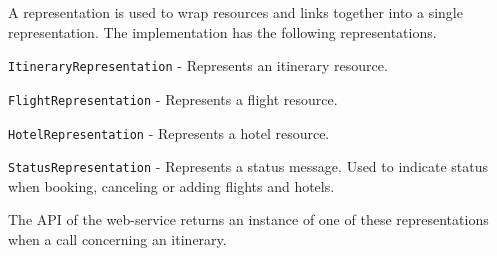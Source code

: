 \noindent
A representation is used to wrap resources and links together into a single representation. 
The implementation has the following representations.
\begin{description}
	\item \texttt{ItineraryRepresentation} - Represents an itinerary resource. 
	\item \texttt{FlightRepresentation} - Represents a flight resource.
	\item \texttt{HotelRepresentation} - Represents a hotel resource.
	\item \texttt{StatusRepresentation} - Represents a status message. Used to indicate status when booking, canceling or adding flights and hotels.
\end{description}
The API of the web-service returns an instance of one of these representations when a call concerning an itinerary.